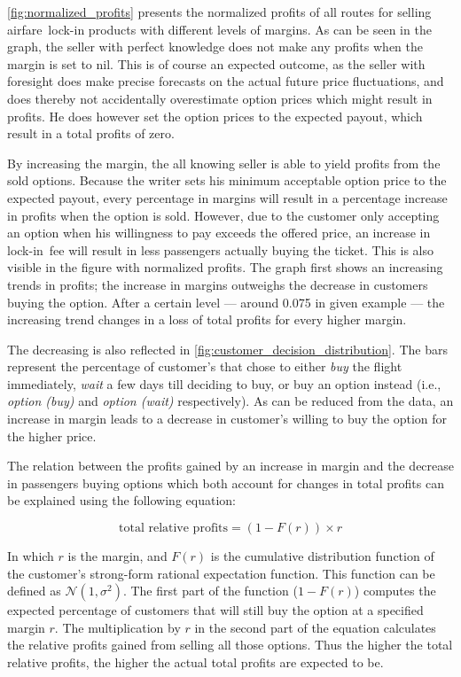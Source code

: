 \autoref{fig:normalized_profits} presents the normalized profits of all routes for selling airfare~lock-in products with different levels of margins. As can be seen in the graph, the seller with perfect knowledge does not make any profits when the margin is set to nil. This is of course an expected outcome, as the seller with foresight does make precise forecasts on the actual future price fluctuations, and does thereby not accidentally overestimate option prices which might result in profits. He does however set the option prices to the expected payout, which result in a total profits of zero.


By increasing the margin, the all knowing seller is able to yield profits from the sold options. Because the writer sets his minimum acceptable option price to the expected payout, every percentage in margins will result in a percentage increase in profits when the option is sold. However, due to the customer only accepting an option when his willingness to pay exceeds the offered price, an increase in lock-in~fee will result in less passengers actually buying the ticket. This is also visible in the figure with normalized profits. The graph first shows an increasing trends in profits; the increase in margins outweighs the decrease in customers buying the option. After a certain level --- around 0.075 in given example --- the increasing trend changes in a loss of total profits for every higher margin.

The decreasing is also reflected in \autoref{fig:customer_decision_distribution}. The bars represent the percentage of customer's that chose to either \emph{buy} the flight immediately, \emph{wait} a few days till deciding to buy, or buy an option instead (i.e., \emph{option (buy)} and \emph{option (wait)} respectively). As can be reduced from the data, an increase in margin leads to a decrease in customer's willing to buy the option for the higher price.


The relation between the profits gained by an increase in margin and the decrease in passengers buying options which both account for changes in total profits can be explained using the following equation:

$$ \mbox{total relative profits} = (1 - F(r)) \times r $$

In which $r$ is the margin, and $F(r)$ is the cumulative distribution function of the customer's strong-form rational expectation function. This function can be defined as $\mathcal{N}(1, \sigma^2)$. The first part of the function ($1 - F(r)$) computes the expected percentage of customers that will still buy the option at a specified margin $r$. The multiplication by $r$ in the second part of the equation calculates the relative profits gained from selling all those options. Thus the higher the total relative profits, the higher the actual total profits are expected to be.

